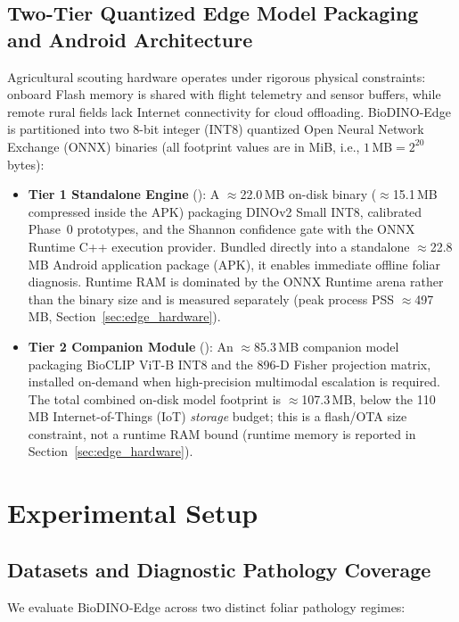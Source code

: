 \documentclass[preprint,12pt]{elsarticle}
\begin{document}
\subsection{Two-Tier Quantized Edge Model Packaging and Android Architecture}
\label{sec:packaging}
Agricultural scouting hardware operates under rigorous physical constraints: onboard Flash memory is shared with flight telemetry and sensor buffers, while remote rural fields lack Internet connectivity for cloud offloading. BioDINO-Edge is partitioned into two 8-bit integer (INT8) quantized Open Neural Network Exchange (ONNX) binaries (all footprint values are in MiB, i.e., $1\,\text{MB}=2^{20}$ bytes):
\begin{itemize}
    \item \textbf{Tier 1 Standalone Engine} (): A $\approx$22.0\,MB on-disk binary ($\approx$15.1\,MB compressed inside the APK) packaging DINOv2 Small INT8, calibrated Phase~0 prototypes, and the Shannon confidence gate with the ONNX Runtime C++ execution provider. Bundled directly into a standalone $\approx$22.8\,MB Android application package (APK), it enables immediate offline foliar diagnosis. Runtime RAM is dominated by the ONNX Runtime arena rather than the binary size and is measured separately (peak process PSS $\approx$497\,MB, Section~\ref{sec:edge_hardware}).
    \item \textbf{Tier 2 Companion Module} (): An $\approx$85.3\,MB companion model packaging BioCLIP ViT-B INT8 and the 896-D Fisher projection matrix, installed on-demand when high-precision multimodal escalation is required. The total combined on-disk model footprint is $\approx$107.3\,MB, below the 110\,MB Internet-of-Things (IoT) \emph{storage} budget; this is a flash/OTA size constraint, not a runtime RAM bound (runtime memory is reported in Section~\ref{sec:edge_hardware}).
\end{itemize}

\section{Experimental Setup}
\label{sec:experiments_setup}

\subsection{Datasets and Diagnostic Pathology Coverage}
\label{sec:datasets}
We evaluate BioDINO-Edge across two distinct foliar pathology regimes:
\end{document}

